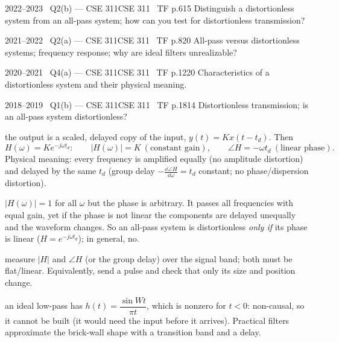 \begin{qcard}{2022--2023 \textbullet\ Q2(b) --- CSE 311}{CSE 311 \textbullet\ TF p.6}{15}
Distinguish a distortionless system from an all-pass system; how can you test for distortionless transmission?
\end{qcard}
\begin{qcard}{2021--2022 \textbullet\ Q2(a) --- CSE 311}{CSE 311 \textbullet\ TF p.8}{20}
All-pass versus distortionless systems; frequency response; why are ideal filters unrealizable?
\end{qcard}
\begin{qcard}{2020--2021 \textbullet\ Q4(a) --- CSE 311}{CSE 311 \textbullet\ TF p.12}{20}
Characteristics of a distortionless system and their physical meaning.
\end{qcard}
\begin{qcard}{2018--2019 \textbullet\ Q1(b) --- CSE 311}{CSE 311 \textbullet\ TF p.18}{14}
Distortionless transmission; is an all-pass system distortionless?
\end{qcard}
\begin{solution}
 the output is a scaled, delayed copy of the input, $y(t)=Kx(t-t_d)$. Then
\[H(\omega)=Ke^{-j\omega t_d}:\qquad |H(\omega)|=K\ (\text{constant gain}),\qquad \angle H=-\omega t_d\ (\text{linear phase}).\]
Physical meaning: every frequency is amplified equally (no amplitude distortion) and delayed by the same $t_d$ (group delay $-\frac{\dd\angle H}{\dd\omega}=t_d$ constant; no phase/dispersion distortion).

 $|H(\omega)|=1$ for all $\omega$ but the phase is arbitrary. It passes all frequencies with equal gain, yet if the phase is not linear the components are delayed unequally and the waveform changes. So an all-pass system is distortionless \emph{only if} its phase is linear ($H=e^{-j\omega t_d}$); in general, no.

 measure $|H|$ and $\angle H$ (or the group delay) over the signal band; both must be flat/linear. Equivalently, send a pulse and check that only its size and position change.

 an ideal low-pass has $h(t)=\dfrac{\sin Wt}{\pi t}$, which is nonzero for $t<0$: non-causal, so it cannot be built (it would need the input before it arrives). Practical filters approximate the brick-wall shape with a transition band and a delay.
\end{solution}


